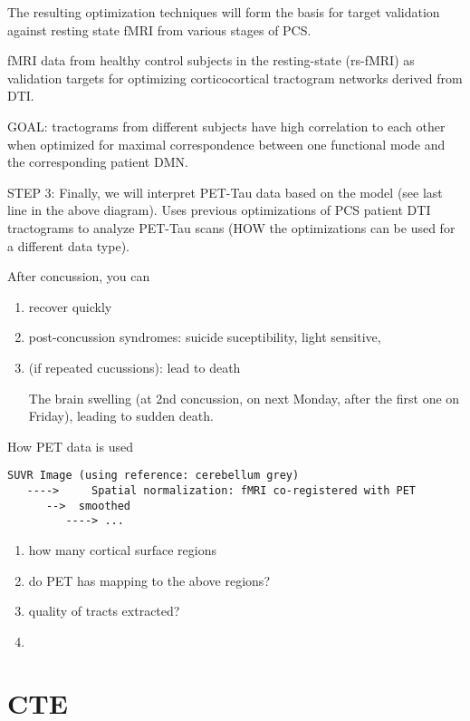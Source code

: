 The resulting optimization techniques will form the basis for target validation
against resting state fMRI from various stages of PCS.

fMRI data from healthy control subjects in the resting-state (rs-fMRI) as
validation targets for optimizing corticocortical tractogram networks derived
from DTI.


GOAL: tractograms from different subjects have high correlation to each other
when optimized for maximal correspondence between one functional mode and the
corresponding patient DMN.


STEP 3: Finally, we will interpret PET-Tau data based on the model (see last
line in the above diagram).
Uses previous optimizations of PCS patient DTI tractograms to analyze PET-Tau
scans (HOW the optimizations can be used for a different data type).

After concussion, you can
\begin{enumerate}
  \item recover quickly
  \item post-concussion syndromes: suicide suceptibility, light sensitive, 
  \item (if repeated cucussions): lead to death
  
  The brain swelling (at 2nd concussion, on next Monday, after the first one on
  Friday), leading to sudden death.
  
\end{enumerate}


How PET data is used
\begin{verbatim}
SUVR Image (using reference: cerebellum grey)
   ---->     Spatial normalization: fMRI co-registered with PET
      -->  smoothed
         ----> ...
\end{verbatim}


\begin{enumerate}
  \item how many cortical surface regions
  
  \item do PET has mapping to the above regions?
  
  \item quality of tracts extracted?
  
  \item 
\end{enumerate}

\section{CTE}
\label{sec:CTE}

